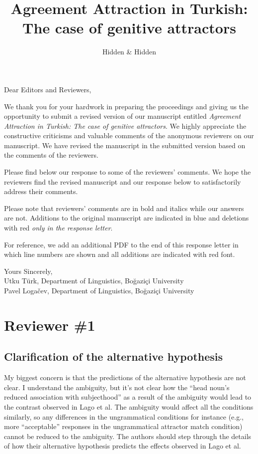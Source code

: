 \documentclass{response}
\title{Agreement Attraction in Turkish: The case of genitive attractors}
\author{Hidden \& Hidden}
\begin{document}
\maketitle

Dear Editors and Reviewers, 

We thank you for your hardwork in preparing the proceedings and giving us the opportunity to submit a revised version of our manuscript entitled \emph{Agreement Attraction in Turkish: The case of genitive attractors}. We highly appreciate the constructive criticisms and valuable comments of the anonymous reviewers on our manuscript. We have revised the manuscript in the submitted version based on the comments of the reviewers. 

Please find below our response to some of the reviewers’ comments. We hope the reviewers find the revised manuscript and our response below to satisfactorily address their comments. 

Please note that reviewers' comments are in bold and italics while our answers are not. Additions to the original manuscript are indicated in blue and deletions with red \emph{only in the response letter}. 

For reference, we add an additional PDF to the end of this response letter in which line numbers are shown and all additions are indicated with red font.

Yours Sincerely,\\
Utku T\"urk, Department of Linguistics, Boğaziçi University\\
Pavel Loga\v{c}ev, Department of Linguistics, Boğaziçi University\\

\section{Reviewer \#1}

\subsection{Clarification of the alternative hypothesis}

\RC My biggest concern is that the predictions of the alternative hypothesis are not clear. I understand the ambiguity, but it’s not clear how the “head noun’s reduced association with subjecthood” as a result of the ambiguity would lead to the contrast observed in Lago et al. The ambiguity would affect all the conditions similarly, so any differences in the ungrammatical conditions for instance (e.g., more “acceptable” responses in the ungrammatical attractor match condition) cannot be reduced to the ambiguity. The authors should step through the details of how their alternative hypothesis predicts the effects observed in Lago et al. 
\end{document}
